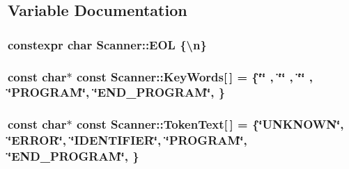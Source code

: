 \subsection{Variable Documentation}
\subsubsection[{\texorpdfstring{E\+OL}{EOL}}]{\setlength{\rightskip}{0pt plus 5cm}constexpr char Scanner\+::\+E\+OL \{\textquotesingle{}\textbackslash{}n\textquotesingle{}\}}\hypertarget{namespace_scanner_a7859e3bfe9933aec7ee80c2d4dcfe948}{}\label{namespace_scanner_a7859e3bfe9933aec7ee80c2d4dcfe948}
\subsubsection[{\texorpdfstring{Key\+Words}{KeyWords}}]{\setlength{\rightskip}{0pt plus 5cm}const char$\ast$ const Scanner\+::\+Key\+Words\mbox{[}$\,$\mbox{]} = \{\char`\"{}\char`\"{} , \char`\"{}\char`\"{} , \char`\"{}\char`\"{} , \char`\"{}P\+R\+O\+G\+R\+AM\char`\"{}, \char`\"{}{\bf E\+N\+D\+\_\+\+P\+R\+O\+G\+R\+AM}\char`\"{}, \}}\hypertarget{namespace_scanner_ab32f938f9fc4150c1017a768a8843f85}{}\label{namespace_scanner_ab32f938f9fc4150c1017a768a8843f85}
\subsubsection[{\texorpdfstring{Token\+Text}{TokenText}}]{\setlength{\rightskip}{0pt plus 5cm}const char$\ast$ const Scanner\+::\+Token\+Text\mbox{[}$\,$\mbox{]} = \{\char`\"{}U\+N\+K\+N\+O\+WN\char`\"{}, \char`\"{}{\bf E\+R\+R\+OR}\char`\"{}, \char`\"{}{\bf I\+D\+E\+N\+T\+I\+F\+I\+ER}\char`\"{}, \char`\"{}{\bf P\+R\+O\+G\+R\+AM}\char`\"{}, \char`\"{}{\bf E\+N\+D\+\_\+\+P\+R\+O\+G\+R\+AM}\char`\"{}, \}}\hypertarget{namespace_scanner_a09cc779e796381e91b23d01033206d4d}{}\label{namespace_scanner_a09cc779e796381e91b23d01033206d4d}
